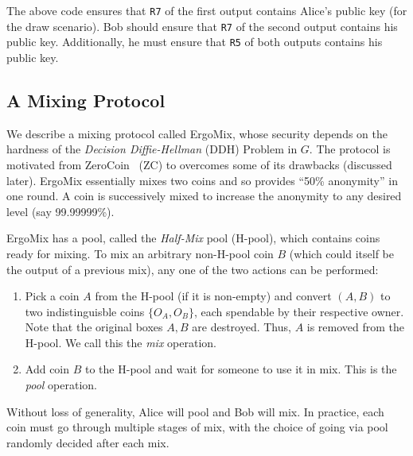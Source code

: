 \documentclass[11pt]{article}
\newcommand{\mixname}{ErgoMix\xspace}
\begin{document}

The above code ensures that \texttt{R7} of the first output contains Alice's public key (for the draw scenario). Bob should ensure that \texttt{R7} of the second output contains his public key. Additionally, he must ensure that \texttt{R5} of both outputs contains his public key.

\subsection{A Mixing Protocol}
\label{mix}

We describe a mixing protocol called \mixname, whose security depends on the hardness of the {\em Decision Diffie-Hellman} (DDH) Problem in $G$. 
The protocol is motivated from ZeroCoin~\cite{zerocoin} (ZC) to overcomes some of its drawbacks (discussed later). 
\mixname essentially mixes two coins and so provides ``50\% anonymity'' in one round. A coin is successively mixed to increase the anonymity to any desired level (say 99.99999\%). 

\mixname has a pool, called the {\em Half-Mix} pool (H-pool), which contains coins ready for mixing. 
To mix an arbitrary non-H-pool coin $B$ (which could itself be the output of a previous mix), any one of the two actions can be performed:
\begin{enumerate}
	\item Pick a coin $A$ from the H-pool (if it is non-empty) and convert $(A, B)$ to two indistinguisble coins $\{O_A, O_B\}$, each spendable by their respective owner. Note that the original boxes $A, B$ are destroyed. Thus, $A$ is removed from the H-pool. We call this the {\em mix} operation. 
	\item Add coin $B$ to the H-pool and wait for someone to use it in mix. This is the {\em pool} operation.
\end{enumerate}

 Without loss of generality, Alice will pool and Bob will mix. In practice, each coin must go through multiple stages of mix, with the choice of going via pool randomly decided after each mix.
\end{document}
